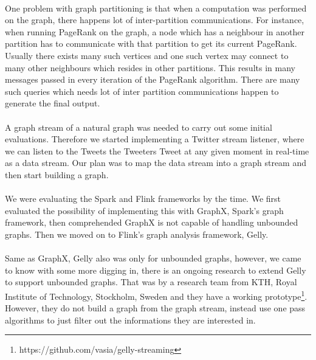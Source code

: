\documentclass[12pt]{report}
\numberwithin{figure}{section}
\numberwithin{table}{section}
\begin{document}
\paragraph{}

One problem with graph partitioning  is that when a computation was performed on the graph, there happens lot of inter-partition communications. For instance, when running PageRank on the graph, a node which has a neighbour in another partition has to communicate with that partition to get its current PageRank. Usually there exists many such vertices and one such vertex may connect to many other neighbours which resides in other partitions. This results in many messages passed in every iteration of the PageRank algorithm. There are many such queries which needs lot of inter partition communications happen to generate the final output.

\paragraph{}

A graph stream of a natural graph was needed to carry out some initial evaluations. Therefore we started implementing a Twitter stream listener, where we can listen to the Tweets the Tweeters Tweet at any given moment in real-time as a data stream. Our plan was to map the data stream into a graph stream and then start building a graph. 

\paragraph{}

We were evaluating the Spark and Flink frameworks by the time. We first evaluated the possibility of implementing this with GraphX, Spark’s graph framework, then comprehended GraphX is not capable of handling unbounded graphs. Then we moved on to Flink’s graph analysis framework, Gelly. 

\paragraph{}

Same as GraphX, Gelly also was only for unbounded graphs, however, we came to know with some more digging in, there is an ongoing research\cite{Kalavri} to extend Gelly to support unbounded graphs. That was by a research team from KTH, Royal Institute of Technology, Stockholm, Sweden and they have a working prototype\footnote{https://github.com/vasia/gelly-streaming}. However, they do not build a graph from the graph stream, instead use one pass algorithms to just filter out the informations they are interested in. 
\end{document}
